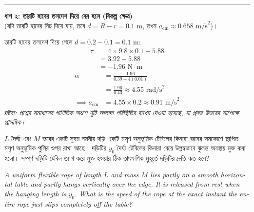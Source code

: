 \documentclass[12pt, a4paper]{article}
\begin{document}
\begin{tcolorbox}[solutionbox={সমাধান (Solution)}]
    \vspace{0.8em}
    \hrule
    \vspace{0.8em}
    
    \noindent\textbf{ধাপ ২: তারটি হাবের তলদেশ দিয়ে বের হলে (বিকল্প ক্ষেত্র)} \\
    (যদি তারটি হাবের নিচ দিয়ে যায়, তবে $d = R - r = 0.1\text{ m}$, তখন $a_{\text{cm}} \approx 0.658\text{ m/s}^2$)।
    
    তারটি হাবের তলদেশ দিয়ে গেলে $d = 0.2 - 0.1 = 0.1\text{ m}$:
    \begin{align*}
        \tau &= 4 \times 9.8 \times 0.1 - 5.88 \\
        &= 3.92 - 5.88 \\
        &= -1.96\text{ N}\cdot\text{m}
    \end{align*}
    \begin{align*}
        \alpha &= \frac{1.96}{0.39 + 4(0.01)} \\
        &= \frac{1.96}{0.43} \approx 4.55\text{ rad/s}^2 \\
        \implies a_{\text{cm}} &= 4.55 \times 0.2 \approx \mathbf{0.91}\text{ m/s}^2
    \end{align*}
    \textit{দ্রষ্টব্য: প্রশ্নের সমাধানের গাণিতিক অংশে দুটি আলাদা পরিস্থিতির ব্যাখ্যা দেওয়া হয়েছে, যা প্রদত্ত উত্তরের সাপেক্ষে প্রাসঙ্গিক।}
\end{tcolorbox}

\begin{tcolorbox}[questionbox={প্রশ্ন (Question) 3}]
    \noindent
    $L$ দৈর্ঘ্য এবং $M$ ভরের একটি সুষম নমনীয় দড়ি একটি মসৃণ অনুভূমিক টেবিলের কিনারা বরাবর সমকোণে স্থাপিত মসৃণ অনুভূমিক পুলির ওপর রাখা আছে। দড়িটির $y_0$ দৈর্ঘ্য টেবিলের কিনারা বেয়ে উল্লম্বভাবে ঝুলন্ত অবস্থায় মুক্ত করা হলো। সম্পূর্ণ দড়িটি টেবিল ত্যাগ করে মুক্ত হওয়ার ঠিক তাৎক্ষণিক মুহূর্তে দড়িটির দ্রুতি কত হবে?
    
    \vspace{0.8em}
    \begin{english}
    \noindent\textit{\color{darkgray}
    A uniform flexible rope of length $L$ and mass $M$ lies partly on a smooth horizontal table and partly hangs vertically over the edge. It is released from rest when the hanging length is $y_0$. What is the speed of the rope at the exact instant the entire rope just slips completely off the table?
    }
    \end{english}
\end{tcolorbox}
\end{document}
